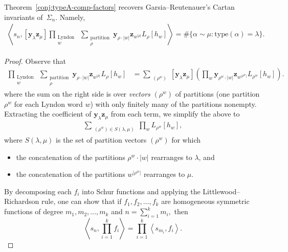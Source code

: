 \documentclass[ALCO, Unicode]{cedram}
\begin{document}
\begin{prop} \label{prop:recovering-GR}
Theorem~\ref{conj:typeA-comp-factors} recovers Garsia--Reutenauer's Cartan invariants of~$\Sigma_n$. Namely, \begin{align*}
  \left \langle s_n, [\mathbf{y}_\lambda\mathbf{z}_\mu] \prod_{\substack{\text{Lyndon }\\ w}} \sum_{\substack{\text{partition}\\\rho}} \mathbf{y}_{\rho \cdot |w|}\mathbf{z}_{w^{|\rho|}}L_{\rho}[h_w] \right \rangle =  \# \{\alpha \sim \mu : \mathrm{type}(\alpha) = \lambda\}.
\end{align*}
\end{prop}
\begin{proof} 
Observe that 
\begin{align*}
[\mathbf{y}_\lambda \mathbf{z}_\mu]\prod_{\substack{\text{Lyndon }\\ w}} \sum_{\substack{\text{partition}\\\rho}} \mathbf{y}_{\rho \cdot |w|}\mathbf{z}_{w^{|\rho|}}L_{\rho}[h_w] &= \sum_{\substack{(\rho^w)}}[\mathbf{y}_\lambda \mathbf{z}_\mu] \left(\prod_{w}\mathbf{y}_{\rho^w \cdot |w|}\mathbf{z}_{w^{|\rho^w|}}L_{\rho^w}[h_w]\right).
\end{align*} where the sum on the right side is over \textit{vectors} $(\rho^w)$ of partitions (one partition $\rho^w$ for each Lyndon word $w$) with only finitely many of the partitions nonempty. Extracting the coefficient of $\mathbf{y}_\lambda \mathbf{z}_\mu$ from each term, we simplify the above to 
\begin{align*}
\sum_{\substack{(\rho^w) \in S(\lambda, \mu)}}\prod_w L_{\rho^w}[h_w],
\end{align*}
where $S(\lambda, \mu)$ is the set of partition vectors $(\rho^w)$ for which 
\begin{itemize}
    \item the concatenation of the partitions $\rho^w\cdot|w|$ rearranges to $\lambda$, and 
    \item the concatenation of the partitions $w^{|\rho^w|}$ rearranges to $\mu.$
\end{itemize}
By decomposing each $f_i$ into Schur functions and applying the Littlewood--Richardson rule, one can show that if $f_1, f_2, \ldots, f_k$ are homogeneous symmetric functions of degree $m_1, m_2, \ldots, m_k$ and $n = \sum_{i = 1}^k m_i,$ then 
\[\left \langle s_n, \prod_{i = 1}^k f_i \right \rangle = \prod_{i = 1}^k \left \langle s_{m_i}, f_i\right \rangle.\]


\end{proof}
\end{document}

